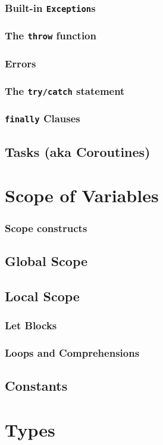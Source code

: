     \subsection{Built-in \texttt{Exception}s}
    \subsection{The \texttt{throw} function}
    \subsection{Errors}
    \subsection{The \texttt{try/catch} statement}
    \subsection{\texttt{finally} Clauses}
    \section{Tasks (aka Coroutines)}
\chapter{Scope of Variables}
    \subsection{Scope constructs}
    \section{Global Scope}
    \section{Local Scope}
    \subsection{Let Blocks}
    \subsection{Loops and Comprehensions}
    \section{Constants}
\chapter{Types}
